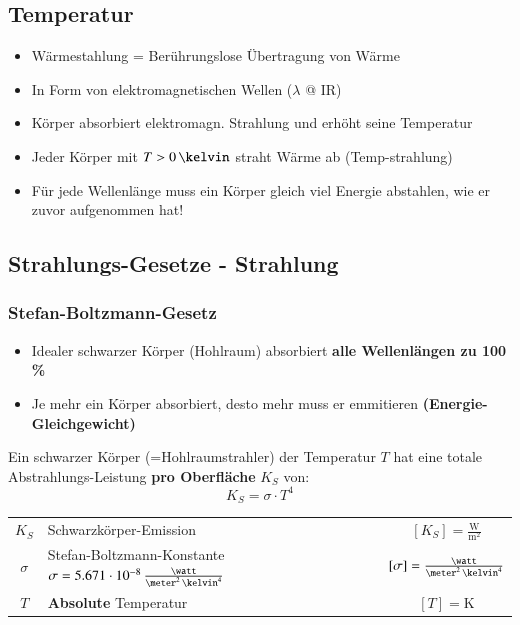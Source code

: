 \subsection{Temperatur}
\begin{itemize}
	\item Wärmestahlung = Berührungslose Übertragung von Wärme 
	\item In Form von elektromagnetischen Wellen ($\lambda$ @ IR)
	\item Körper absorbiert elektromagn. Strahlung und erhöht seine Temperatur
	\item Jeder Körper mit $T > 0 \, \kelvin$ straht Wärme ab (Temp-strahlung)
	\item Für jede Wellenlänge muss ein Körper gleich viel Energie abstahlen, wie er zuvor aufgenommen hat!
\end{itemize}
\smallskip

\subsection{Strahlungs-Gesetze - Strahlung} \label{subsec:Strahlung}

\subsubsection{Stefan-Boltzmann-Gesetz}

\begin{itemize}
	\item Idealer schwarzer Körper (Hohlraum) absorbiert \textbf{alle Wellenlängen zu 100 \%}
	\item Je mehr ein Körper absorbiert, desto mehr muss er emmitieren \textbf{(Energie-Gleichgewicht)}
\end{itemize}


Ein schwarzer Körper (=Hohlraumstrahler) der Temperatur $T$ hat eine totale Abstrahlungs-Leistung \textbf{pro Oberfläche} $K_S$ von: 
$$ \boxed{ K_S = \sigma \cdot T^4 }  $$


\renewcommand{\arraystretch}{1.3}
\begin{tabular}{c l c}
	$K_S$ 		& Schwarzkörper-Emission 																			& $[K_S] = \mathrm{\frac{W}{m^2}}$ 					\\
	$\sigma$ 	& Stefan-Boltzmann-Konstante $\sigma = 5.671 \cdot 10^{-8} \, \frac{\watt}{\meter^2 \, \kelvin^4}$ 	& $[\sigma] = \frac{\watt}{\meter^2 \, \kelvin^4}$	\\
	$T$ 		& \textbf{Absolute} Temperatur 																		& $[T] = \mathrm{K}$
\end{tabular}
\renewcommand{\arraystretch}{1}


